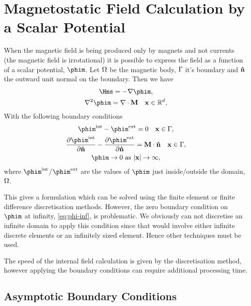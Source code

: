 \section{Magnetostatic Field Calculation by a Scalar Potential}
\label{sec:magstat-field-calc-pote}

When the magnetic field is being produced only by magnets and not currents (\ie the magnetic field is irrotational) it is possible to express the field as a function of a scalar potential, $\phim$.\cite{Coey2010} Let $\Omega$ be the magnetic body, ${\Gamma}$ it's boundary and $\mathbf{\hat{n}}$ the outward unit normal on the boundary. Then we have
\begin{gather}
  \Hms = - \nabla \phim,  \label{eq:Hms} \\
  \lap \phim = \nabla \cdot \Mv \quad \xv \in \fulld, \label{eq:nnphim}
\end{gather}
With the following boundary conditions
\begin{gather}
  \phim^\inte - \phim^\exte = 0 \quad \xv \in \boundd, \label{eq:cont-phi-bound} \\
  \pd{\phim^\inte}{\nv} - \pd{\phim^\exte}{\nv} = \Mv \cdot \nv \quad \xv \in \boundd,
  \label{eq:nndphidn-bound} \\
  \phim \rightarrow 0 \text{ as } \abs{\xv} \rightarrow \infty, \label{eq:phi-inf}
\end{gather}
where $\phim^\inte$/$\phim^\exte$ are the values of $\phim$ just inside/outside the domain, $\Omega$.

This gives a formulation which can be solved using the finite element or finite difference discretisation methods. However, the zero boundary condition on $\phim$ at infinity, \eqref{eq:phi-inf}, is problematic. We obviously can not discretise an infinite domain to apply this condition since that would involve either infinite discrete elements or an infinitely sized element. Hence other techniques must be used.

The speed of the internal field calculation is given by the discretisation method, however applying the boundary conditions can require additional processing time.


\subsection{Asymptotic Boundary Conditions}
\label{sec:asymptot-bcs}

